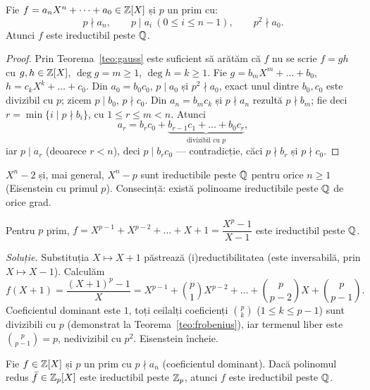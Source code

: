 \begin{teorema}\label{teo:eisenstein}
Fie $f=a_nX^n+\dots+a_0\in\mathbb{Z}[X]$ și $p$ un prim cu:
\[
p\nmid a_n,\qquad p\mid a_i\ (0\le i\le n-1),\qquad p^2\nmid a_0.
\]
Atunci $f$ este ireductibil peste $\mathbb{Q}$.
\end{teorema}

\begin{proof}
Prin Teorema~\ref{teo:gauss} este suficient să arătăm că $f$ nu se scrie $f=gh$ cu $g,h\in\mathbb{Z}[X]$, $\deg g=m\ge1$, $\deg h=k\ge1$. Fie $g=b_mX^m+\dots+b_0$, $h=c_kX^k+\dots+c_0$. Din $a_0=b_0c_0$, $p\mid a_0$ și $p^2\nmid a_0$, exact unul dintre $b_0,c_0$ este divizibil cu $p$; zicem $p\mid b_0$, $p\nmid c_0$. Din $a_n=b_mc_k$ și $p\nmid a_n$ rezultă $p\nmid b_m$; fie deci $r=\min\{i\mid p\nmid b_i\}$, cu $1\le r\le m<n$. Atunci
\[
a_r=b_rc_0+\underbrace{b_{r-1}c_1+\dots+b_0c_r}_{\text{divizibil cu }p},
\]
iar $p\mid a_r$ (deoarece $r<n$), deci $p\mid b_rc_0$ --- contradicție, căci $p\nmid b_r$ și $p\nmid c_0$.
\end{proof}

\begin{exemplu}
$X^n-2$ și, mai general, $X^n-p$ sunt ireductibile peste $\mathbb{Q}$ pentru orice $n\ge1$ (Eisenstein cu primul $p$). Consecință: există polinoame ireductibile peste $\mathbb{Q}$ de orice grad.
\end{exemplu}

\begin{aplicatie}\label{apl:ciclotomic}
Pentru $p$ prim, $f=X^{p-1}+X^{p-2}+\dots+X+1=\dfrac{X^p-1}{X-1}$ este ireductibil peste $\mathbb{Q}$.

\emph{Soluție.} Substituția $X\mapsto X+1$ păstrează (i)reductibilitatea (este inversabilă, prin $X\mapsto X-1$). Calculăm
\[
f(X+1)=\frac{(X+1)^p-1}{X}=X^{p-1}+\binom p1X^{p-2}+\dots+\binom{p}{p-2}X+\binom{p}{p-1}.
\]
Coeficientul dominant este $1$, toți ceilalți coeficienți $\binom pk$ ($1\le k\le p-1$) sunt divizibili cu $p$ (demonstrat la Teorema~\ref{teo:frobenius}), iar termenul liber este $\binom p{p-1}=p$, nedivizibil cu $p^2$. Eisenstein încheie.
\end{aplicatie}

\begin{teorema}\label{teo:redmodp}
Fie $f\in\mathbb{Z}[X]$ și $p$ un prim cu $p\nmid a_n$ (coeficientul dominant). Dacă polinomul redus $\bar f\in\mathbb{Z}_p[X]$ este ireductibil peste $\mathbb{Z}_p$, atunci $f$ este ireductibil peste $\mathbb{Q}$.
\end{teorema}


